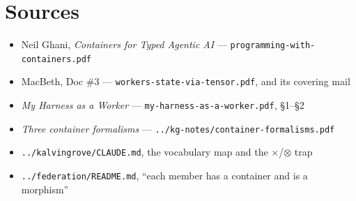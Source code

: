 \documentclass[11pt,a4paper]{article}
\newcommand{\code}[1]{\texttt{\small #1}}
\newcommand{\note}{\emph{Containers for Typed Agentic AI}}
\begin{document}
\section*{Sources}

\begin{itemize}[nosep,leftmargin=*,itemsep=1pt]\small
\item Neil Ghani, \note{} --- \code{programming-with-containers.pdf}
\item MacBeth, Doc \#3 --- \code{workers-state-via-tensor.pdf}, and its covering mail
\item \emph{My Harness as a Worker} --- \code{my-harness-as-a-worker.pdf}, \S1--\S2
\item \emph{Three container formalisms} --- \code{../kg-notes/container-formalisms.pdf}
\item \code{../kalvingrove/CLAUDE.md}, the vocabulary map and the $\times$/$\otimes$ trap
\item \code{../federation/README.md}, ``each member has a container and is a morphism''
\end{itemize}
\end{document}
